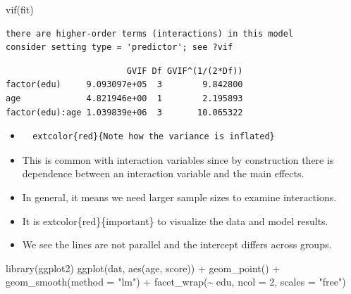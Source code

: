 \documentclass[
  letterpaper,
  DIV=11,
  numbers=noendperiod]{scrreprt}
\newenvironment{Shaded}{\begin{snugshade}}{\end{snugshade}}
\newcommand{\AttributeTok}[1]{\textcolor[rgb]{0.40,0.45,0.13}{#1}}
\newcommand{\DecValTok}[1]{\textcolor[rgb]{0.68,0.00,0.00}{#1}}
\newcommand{\FunctionTok}[1]{\textcolor[rgb]{0.28,0.35,0.67}{#1}}
\newcommand{\NormalTok}[1]{\textcolor[rgb]{0.00,0.23,0.31}{#1}}
\newcommand{\SpecialCharTok}[1]{\textcolor[rgb]{0.37,0.37,0.37}{#1}}
\newcommand{\StringTok}[1]{\textcolor[rgb]{0.13,0.47,0.30}{#1}}
\begin{document}
\begin{Shaded}
\begin{Highlighting}[]
\FunctionTok{vif}\NormalTok{(fit)}
\end{Highlighting}
\end{Shaded}

\begin{verbatim}
there are higher-order terms (interactions) in this model
consider setting type = 'predictor'; see ?vif
\end{verbatim}

\begin{verbatim}
                        GVIF Df GVIF^(1/(2*Df))
factor(edu)     9.093097e+05  3        9.842800
age             4.821946e+00  1        2.195893
factor(edu):age 1.039839e+06  3       10.065322
\end{verbatim}

\begin{itemize}
\item
\begin{verbatim}
  extcolor{red}{Note how the variance is inflated}
\end{verbatim}
\item
  This is common with interaction variables since by construction there
  is dependence between an interaction variable and the main effects.
\item
  In general, it means we need larger sample sizes to examine
  interactions.
\item
  It is extcolor\{red\}\{important\} to visualize the data and model
  results.
\item
  We see the lines are not parallel and the intercept differs across
  groups.
\end{itemize}

\begin{Shaded}
\begin{Highlighting}[]
\FunctionTok{library}\NormalTok{(ggplot2)}
\FunctionTok{ggplot}\NormalTok{(dat, }\FunctionTok{aes}\NormalTok{(age, score)) }\SpecialCharTok{+}
  \FunctionTok{geom\_point}\NormalTok{() }\SpecialCharTok{+}
  \FunctionTok{geom\_smooth}\NormalTok{(}\AttributeTok{method =} \StringTok{"lm"}\NormalTok{) }\SpecialCharTok{+}
  \FunctionTok{facet\_wrap}\NormalTok{(}\SpecialCharTok{\textasciitilde{}}\NormalTok{ edu, }\AttributeTok{ncol =} \DecValTok{2}\NormalTok{, }\AttributeTok{scales =} \StringTok{"free"}\NormalTok{)}
\end{Highlighting}
\end{Shaded}
\end{document}
